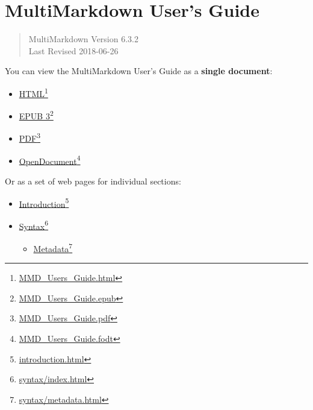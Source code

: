
\def\mytitle{MultiMarkdown User's Guide}
\def\myauthor{Fletcher T. Penney}
\def\version{6.3.2}
\def\revised{2018-06-26}




\chapter{MultiMarkdown User's Guide }
\label{title}

\begin{quote}
MultiMarkdown Version 6.3.2\\
Last Revised 2018-06-26
\end{quote}

You can view the MultiMarkdown User's Guide as a \textbf{single document}:

\begin{itemize}
\item \href{MMD_Users_Guide.html}{HTML}\footnote{\href{MMD_Users_Guide.html}{MMD\_Users\_Guide.html}}

\item \href{MMD_Users_Guide.epub}{EPUB 3}\footnote{\href{MMD_Users_Guide.epub}{MMD\_Users\_Guide.epub}}

\item \href{MMD_Users_Guide.pdf}{PDF}\footnote{\href{MMD_Users_Guide.pdf}{MMD\_Users\_Guide.pdf}}

\item \href{MMD_Users_Guide.fodt}{OpenDocument}\footnote{\href{MMD_Users_Guide.fodt}{MMD\_Users\_Guide.fodt}}

\end{itemize}

Or as a set of web pages for individual sections:

\begin{itemize}
\item \href{introduction.html}{Introduction}\footnote{\href{introduction.html}{introduction.html}}

\item \href{syntax/index.html}{Syntax}\footnote{\href{syntax/index.html}{syntax\slash index.html}}

\begin{itemize}
\item \href{syntax/metadata.html}{Metadata}\footnote{\href{syntax/metadata.html}{syntax\slash metadata.html}}

\end{itemize}

\end{itemize}




